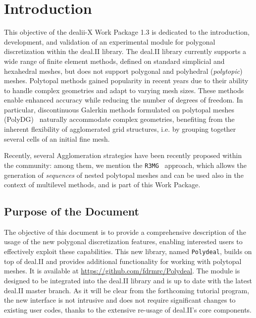 \documentclass[a4paper,12pt]{article}
\begin{document}
\disclaimer

\newpage

\tableofcontents %

\newpage

\section{{Introduction}}
This objective of the dealii-X Work Package 1.3 is dedicated to the introduction, development, and validation
of an experimental module for polygonal discretization within the deal.II library. The deal.II library
currently supports a wide range of finite element methods, defined on standard simplicial
and hexahedral meshes, but does not support polygonal and polyhedral (\emph{polytopic}) meshes. Polytopal methods
gained popularity in recent years due to their ability to handle complex geometries and adapt to varying mesh
sizes. These methods enable enhanced accuracy while reducing the number of degrees
of freedom. In particular, discontinuous Galerkin methods formulated on polytopal meshes
(PolyDG)~\cite{polyDG,Antoniettihp} naturally accommodate complex geometries, benefiting from the inherent flexibility of
agglomerated grid structures, i.e. by grouping together several cells of an initial fine mesh.

Recently, several Agglomeration strategies have been recently proposed within the community: among them, we mention
the \texttt{R3MG}~\cite{FEDER2025113773} approach, which
allows the generation of \emph{sequences} of nested polytopal meshes and can be used
also in the context of multilevel methods, and is part of this Work Package.

\subsection{{Purpose of the Document}}
The objective of this document is to provide a comprehensive description of
the usage of the new polygonal discretization features, enabling interested users
to effectively exploit these capabilities.  This new library, named \texttt{Polydeal}, builds on top of
deal.II and provides additional functionality for working with polytopal meshes. It is
available at \url{https://github.com/fdrmrc/Polydeal}. The module is designed to be integrated
into the deal.II library and is up to date with the latest deal.II master branch. As it will be clear
from the forthcoming tutorial program, the new interface is not intrusive and does not require significant changes to existing user
codes, thanks to the extensive re-usage of deal.II's core components.
\end{document}
